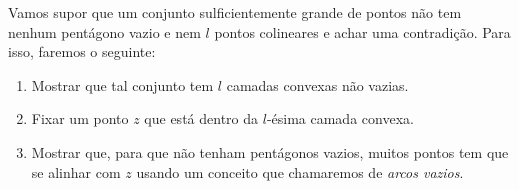 
Vamos supor que um conjunto sulficientemente grande de pontos não tem nenhum pentágono vazio e nem $l$ pontos colineares e achar uma contradição. Para isso, faremos o seguinte:
\begin{enumerate}
    \item Mostrar que tal conjunto tem $l$ camadas convexas não vazias.
    \item Fixar um ponto $z$ que está dentro da $l$-ésima camada convexa.
    \item Mostrar que, para que não tenham pentágonos vazios, muitos pontos tem que se alinhar com $z$ usando um conceito que chamaremos de \textit{arcos vazios}.
\end{enumerate}

